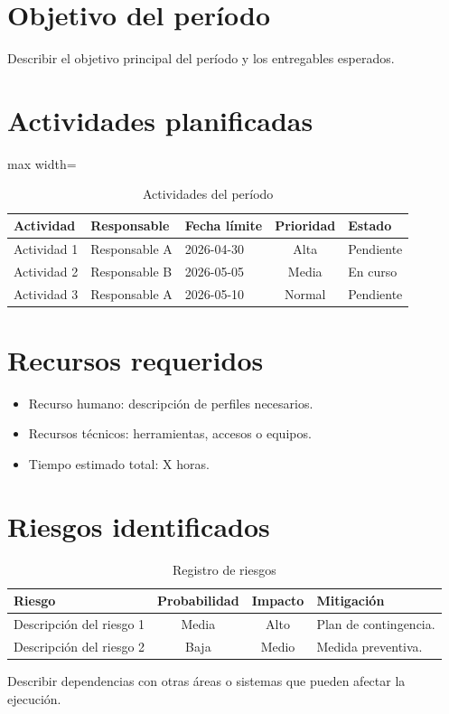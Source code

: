 \documentclass{../base/canon}
\begin{document}
\section{Objetivo del período}

\begin{ParrafoEjecutivo}
Describir el objetivo principal del período y los entregables esperados.
\end{ParrafoEjecutivo}

\section{Actividades planificadas}

\begin{table}[H]
  \centering
  \caption{Actividades del período}
  \begin{adjustbox}{max width=\linewidth}
  \begin{tabular}{l l l c l}
    \toprule
    \textbf{Actividad} & \textbf{Responsable} & \textbf{Fecha límite} & \textbf{Prioridad} & \textbf{Estado} \\
    \midrule
    Actividad 1 & Responsable A & 2026-04-30 & Alta    & Pendiente \\
    Actividad 2 & Responsable B & 2026-05-05 & Media   & En curso  \\
    Actividad 3 & Responsable A & 2026-05-10 & Normal  & Pendiente \\
    \bottomrule
  \end{tabular}
  \end{adjustbox}
\end{table}

\section{Recursos requeridos}

\begin{itemize}
  \item Recurso humano: descripción de perfiles necesarios.
  \item Recursos técnicos: herramientas, accesos o equipos.
  \item Tiempo estimado total: X horas.
\end{itemize}

\section{Riesgos identificados}

\begin{table}[H]
  \centering
  \caption{Registro de riesgos}
  \begin{tabular}{p{5cm} c c p{5cm}}
    \toprule
    \textbf{Riesgo} & \textbf{Probabilidad} & \textbf{Impacto} & \textbf{Mitigación} \\
    \midrule
    Descripción del riesgo 1 & Media & Alto & Plan de contingencia. \\
    Descripción del riesgo 2 & Baja  & Medio & Medida preventiva.  \\
    \bottomrule
  \end{tabular}
\end{table}

\begin{ObservationBox}[Dependencias]
  Describir dependencias con otras áreas o sistemas que pueden afectar la ejecución.
\end{ObservationBox}


\ContactSignature
\end{document}
